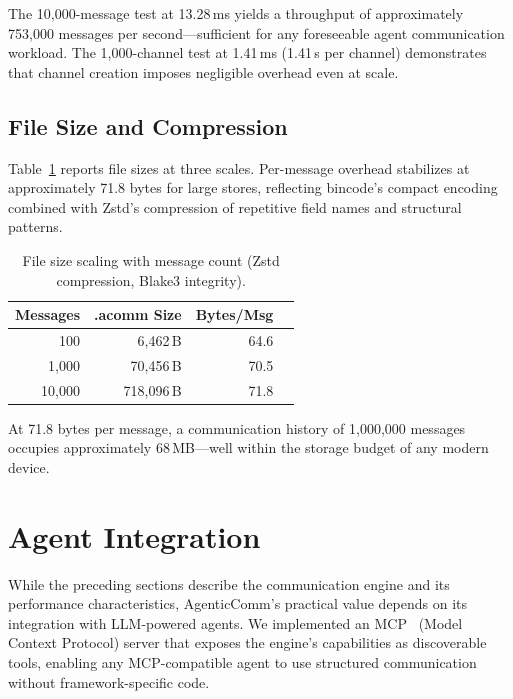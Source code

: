 \documentclass[10pt, twocolumn]{article}
\begin{document}
The 10{,}000-message test at 13.28\,ms yields a throughput of approximately 753{,}000 messages per second---sufficient for any foreseeable agent communication workload. The 1{,}000-channel test at 1.41\,ms (1.41\,\textmu{}s per channel) demonstrates that channel creation imposes negligible overhead even at scale.


\subsection{File Size and Compression}

Table~\ref{tab:filesize} reports file sizes at three scales. Per-message overhead stabilizes at approximately 71.8 bytes for large stores, reflecting bincode's compact encoding combined with Zstd's compression of repetitive field names and structural patterns.

\begin{table}[t]
\caption{File size scaling with message count (Zstd compression, Blake3 integrity).}
\label{tab:filesize}
\centering
\small
\begin{tabular}{@{}rrrr@{}}
\toprule
\textbf{Messages} & \textbf{.acomm Size} & \textbf{Bytes/Msg} \\
\midrule
100 & 6{,}462\,B & 64.6 \\
1{,}000 & 70{,}456\,B & 70.5 \\
10{,}000 & 718{,}096\,B & 71.8 \\
\bottomrule
\end{tabular}
\end{table}

At 71.8 bytes per message, a communication history of 1{,}000{,}000 messages occupies approximately 68\,MB---well within the storage budget of any modern device.


\section{Agent Integration}
\label{sec:agent}

While the preceding sections describe the communication engine and its performance characteristics, AgenticComm's practical value depends on its integration with LLM-powered agents. We implemented an MCP~\cite{mcp2024} (Model Context Protocol) server that exposes the engine's capabilities as discoverable tools, enabling any MCP-compatible agent to use structured communication without framework-specific code.
\end{document}
